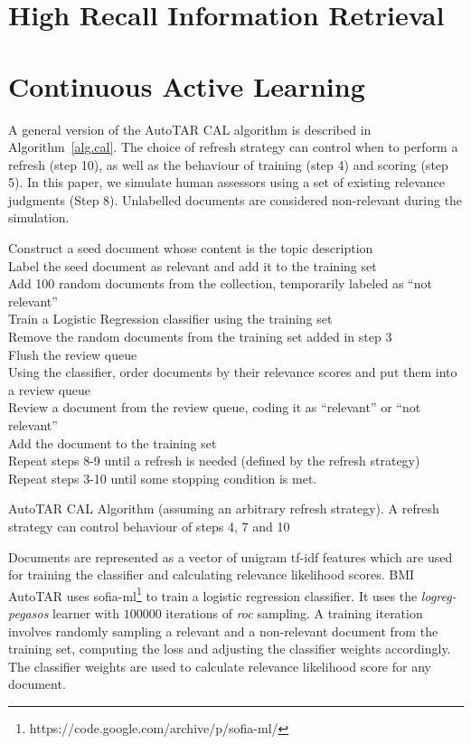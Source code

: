 \label{chap:rel}


\section{High Recall Information Retrieval}

\section{Continuous Active Learning}

A general version of the AutoTAR CAL algorithm is described in
Algorithm~\ref{alg.cal}.  The choice of refresh strategy can control when to
perform a refresh (step 10), as well as the behaviour of training (step 4) and
scoring (step 5). In this paper, we simulate human assessors using a set of
existing relevance judgments (Step 8). Unlabelled documents are considered
non-relevant during the simulation.

\begin{algorithm}[]
Construct a seed document whose content is the topic description \\
Label the seed document as relevant and add it to the training set \\
Add 100 random documents from the collection, temporarily labeled as ``not
relevant'' \\
Train a Logistic Regression classifier using the training set \\
Remove the random documents from the training set added in step 3 \\
Flush the review queue \\
Using the classifier, order documents by their relevance scores and put them
into a review queue \\ Review a document from the review queue, coding it as
``relevant'' or ``not relevant'' \\
Add the document to the training set \\
Repeat steps 8-9 until a refresh is needed (defined by the refresh strategy) \\
Repeat steps 3-10 until some stopping condition is met.
\caption{AutoTAR CAL Algorithm (assuming an arbitrary refresh strategy). A refresh
strategy can control behaviour of steps 4, 7 and 10}
\label{alg.cal}
\end{algorithm}

Documents are represented as a vector of unigram tf-idf features which are used
for training the classifier and calculating relevance likelihood scores. BMI
AutoTAR uses sofia-ml\footnote{https://code.google.com/archive/p/sofia-ml/}
\cite{sculley2010combined} to train a logistic regression classifier. It uses
the \textit{logreg-pegasos} learner with $100000$ iterations of \textit{roc}
sampling. A training iteration involves randomly sampling a relevant and a
non-relevant document from the training set, computing the loss and adjusting
the classifier weights accordingly. The classifier weights are used to calculate
relevance likelihood score for any document.

